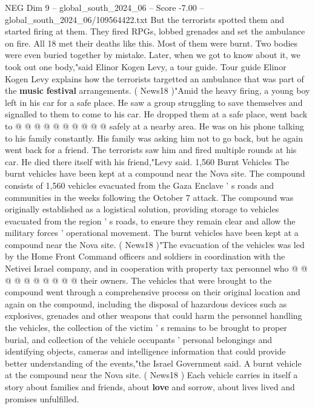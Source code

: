 \begin{textsample}{NEG Dim 9 – global\_south\_2024\_06 – Score -7.00 – global\_south\_2024\_06/109564422.txt}
But the terrorists spotted them and started firing at them.
They fired RPGs, lobbed grenades and set the ambulance on fire.
All 18 met their deaths like this.
Most of them were burnt.
Two bodies were even buried together by mistake.
Later, when we got to know about it, we took out one body,"said Elinor Kogen Levy, a tour guide.
Tour guide Elinor Kogen Levy explains how the terrorists targetted an ambulance that was part of the \textbf{music} \textbf{festival} arrangements. ( News18 )"Amid the heavy firing, a young boy left in his car for a safe place.
He saw a group struggling to save themselves and signalled to them to come to his car.
He dropped them at a safe place, went back to @ @ @ @ @ @ @ @ @ @ safely at a nearby area.
He was on his phone talking to his family constantly.
His family was asking him not to go back, but he again went back for a friend.
The terrorists saw him and fired multiple rounds at his car.
He died there itself with his friend,"Levy said. 1,560 Burnt Vehicles The burnt vehicles have been kept at a compound near the Nova site.
The compound consists of 1,560 vehicles evacuated from the Gaza Enclave ' s roads and communities in the weeks following the October 7 attack.
The compound was originally established as a logistical solution, providing storage to vehicles evacuated from the region ' s roads, to ensure they remain clear and allow the military forces ' operational movement.
The burnt vehicles have been kept at a compound near the Nova site. ( News18 )"The evacuation of the vehicles was led by the Home Front Command officers and soldiers in coordination with the Netivei Israel company, and in cooperation with property tax personnel who @ @ @ @ @ @ @ @ @ @ their owners.
The vehicles that were brought to the compound went through a comprehensive process on their original location and again on the compound, including the disposal of hazardous devices such as explosives, grenades and other weapons that could harm the personnel handling the vehicles, the collection of the victim ' s remains to be brought to proper burial, and collection of the vehicle occupants ' personal belongings and identifying objects, cameras and intelligence information that could provide better understanding of the events,"the Israel Government said.
A burnt vehicle at the compound near the Nova site. ( News18 ) Each vehicle carries in itself a story about families and friends, about \textbf{love} and sorrow, about lives lived and promises unfulfilled.

\end{textsample}
